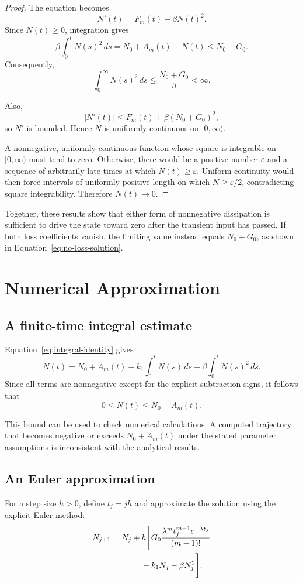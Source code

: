 \documentclass[12pt]{article}
\theoremstyle{definition}
\theoremstyle{remark}
\begin{document}
\begin{proof}
The equation becomes
\[
N'(t)=F_m(t)-\beta N(t)^2.
\]
Since \(N(t)\geq 0\), integration gives
\[
\beta\int_0^t N(s)^2\,ds
=
N_0+A_m(t)-N(t)
\leq N_0+G_0.
\]
Consequently,
\[
\int_0^\infty N(s)^2\,ds
\leq \frac{N_0+G_0}{\beta}<\infty.
\]

Also,
\[
|N'(t)|\leq F_m(t)+\beta(N_0+G_0)^2,
\]
so \(N'\) is bounded. Hence \(N\) is uniformly
continuous on \([0,\infty)\).

A nonnegative, uniformly continuous function whose
square is integrable on \([0,\infty)\) must tend to
zero. Otherwise, there would be a positive number
\(\varepsilon\) and a sequence of arbitrarily late
times at which \(N(t)\geq\varepsilon\). Uniform
continuity would then force intervals of uniformly
positive length on which \(N\geq\varepsilon/2\),
contradicting square integrability. Therefore
\(N(t)\to 0\).
\end{proof}

Together, these results show that either form of
nonnegative dissipation is sufficient to drive the
state toward zero after the transient input has passed.
If both loss coefficients vanish, the limiting value
instead equals \(N_0+G_0\), as shown in
Equation~\eqref{eq:no-loss-solution}.

\section{Numerical Approximation}

\subsection{A finite-time integral estimate}

Equation~\eqref{eq:integral-identity} gives
\[
N(t)=N_0+A_m(t)
-k_1\int_0^t N(s)\,ds
-\beta\int_0^t N(s)^2\,ds.
\]
Since all terms are nonnegative except for the
explicit subtraction signs, it follows that
\[
0\leq N(t)\leq N_0+A_m(t).
\]

This bound can be used to check numerical calculations.
A computed trajectory that becomes negative or exceeds
\(N_0+A_m(t)\) under the stated parameter assumptions
is inconsistent with the analytical results.

\subsection{An Euler approximation}

For a step size \(h>0\), define \(t_j=jh\) and
approximate the solution using the explicit Euler method:
\begin{equation}
\begin{aligned}
N_{j+1}
={}&N_j+h\Bigg[
G_0\frac{\lambda^m t_j^{m-1}e^{-\lambda t_j}}
{(m-1)!}\\
&\hspace{2.4em}
-k_1N_j-\beta N_j^2
\Bigg].
\end{aligned}
\label{eq:euler}
\end{equation}
\end{document}
